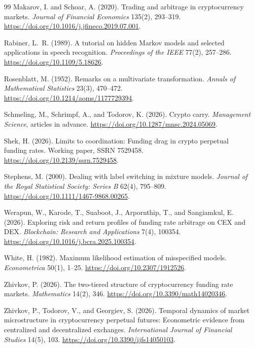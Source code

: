 \documentclass[10pt,a4paper]{article}
\begin{document}
\begin{thebibliography}{99}
Makarov, I. and Schoar, A. (2020).
\newblock Trading and arbitrage in cryptocurrency markets.
\newblock \textit{Journal of Financial Economics} 135(2), 293--319.
\newblock \url{https://doi.org/10.1016/j.jfineco.2019.07.001}.

Rabiner, L.~R. (1989).
\newblock A tutorial on hidden Markov models and selected applications in speech recognition.
\newblock \textit{Proceedings of the IEEE} 77(2), 257--286.
\newblock \url{https://doi.org/10.1109/5.18626}.

Rosenblatt, M. (1952).
\newblock Remarks on a multivariate transformation.
\newblock \textit{Annals of Mathematical Statistics} 23(3), 470--472.
\newblock \url{https://doi.org/10.1214/aoms/1177729394}.

Schmeling, M., Schrimpf, A., and Todorov, K. (2026).
\newblock Crypto carry.
\newblock \textit{Management Science}, articles in advance.
\newblock \url{https://doi.org/10.1287/mnsc.2024.05069}.

Shek, H. (2026).
\newblock Limits to coordination: Funding drag in crypto perpetual funding rates.
\newblock Working paper, SSRN 7529458.
\newblock \url{https://doi.org/10.2139/ssrn.7529458}.

Stephens, M. (2000).
\newblock Dealing with label switching in mixture models.
\newblock \textit{Journal of the Royal Statistical Society: Series B} 62(4), 795--809.
\newblock \url{https://doi.org/10.1111/1467-9868.00265}.

Werapun, W., Karode, T., Suaboot, J., Arpornthip, T., and Sangiamkul, E. (2026).
\newblock Exploring risk and return profiles of funding rate arbitrage on CEX and DEX.
\newblock \textit{Blockchain: Research and Applications} 7(4), 100354.
\newblock \url{https://doi.org/10.1016/j.bcra.2025.100354}.

White, H. (1982).
\newblock Maximum likelihood estimation of misspecified models.
\newblock \textit{Econometrica} 50(1), 1--25.
\newblock \url{https://doi.org/10.2307/1912526}.

Zhivkov, P. (2026).
\newblock The two-tiered structure of cryptocurrency funding rate markets.
\newblock \textit{Mathematics} 14(2), 346.
\newblock \url{https://doi.org/10.3390/math14020346}.

Zhivkov, P., Todorov, V., and Georgiev, S. (2026).
\newblock Temporal dynamics of market microstructure in cryptocurrency perpetual futures: Econometric evidence from centralized and decentralized exchanges.
\newblock \textit{International Journal of Financial Studies} 14(5), 103.
\newblock \url{https://doi.org/10.3390/ijfs14050103}.

\end{thebibliography}
\end{document}
